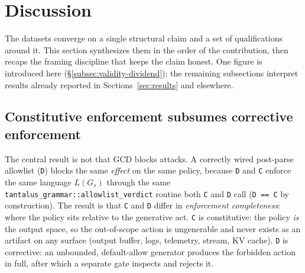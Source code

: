 \section{Discussion}
\label{sec:discussion}

The datasets converge on a single structural claim and a set of qualifications around it. This section synthesizes them in the order of the contribution, then recaps the framing discipline that keeps the claim honest. One figure is introduced here (\S\ref{subsec:validity-dividend}); the remaining subsections interpret results already reported in Sections~\ref{sec:results} and elsewhere.

\subsection{Constitutive enforcement subsumes corrective enforcement}
\label{subsec:constitutive-subsumes}

The central result is not that GCD blocks attacks. A correctly wired post-parse allowlist (\texttt{D}) blocks the same \emph{effect} on the same policy, because \texttt{D} and \texttt{C} enforce the same language \(L(G_s)\) through the same \texttt{tantalus\_grammar::allowlist\_verdict} routine both \texttt{C} and \texttt{D} call (\texttt{D == C} by construction). The result is that \texttt{C} and \texttt{D} differ in \emph{enforcement completeness}: where the policy sits relative to the generative act. \texttt{C} is constitutive: the policy \emph{is} the output space, so the out-of-scope action is ungenerable and never exists as an artifact on any surface (output buffer, logs, telemetry, stream, KV cache). \texttt{D} is corrective: an unbounded, default-allow generator produces the forbidden action in full, after which a separate gate inspects and rejects it.


